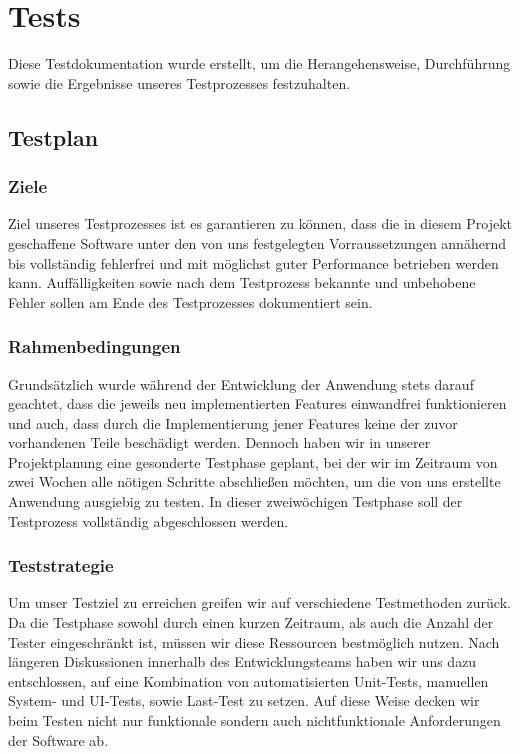 \chapter{Tests}
Diese Testdokumentation wurde erstellt, um die Herangehensweise, Durchführung sowie die Ergebnisse unseres Testprozesses festzuhalten.

\section{Testplan}

\subsection{Ziele}
Ziel unseres Testprozesses ist es garantieren zu können, dass die in diesem Projekt geschaffene Software unter den von uns festgelegten Vorraussetzungen annähernd bis vollständig fehlerfrei und mit möglichst guter Performance betrieben werden kann. Auffälligkeiten sowie nach dem Testprozess bekannte und unbehobene Fehler sollen am Ende des Testprozesses dokumentiert sein.

\subsection{Rahmenbedingungen}
Grundsätzlich wurde während der Entwicklung der Anwendung stets darauf geachtet, dass die jeweils neu implementierten Features einwandfrei funktionieren und auch, dass durch die Implementierung jener Features keine der zuvor vorhandenen Teile beschädigt werden. Dennoch haben wir in unserer Projektplanung eine gesonderte Testphase geplant, bei der wir im Zeitraum von zwei Wochen alle nötigen Schritte abschließen möchten, um die von uns erstellte Anwendung ausgiebig zu testen. In dieser zweiwöchigen Testphase soll der Testprozess vollständig abgeschlossen werden.

\subsection{Teststrategie}
Um unser Testziel zu erreichen greifen wir auf verschiedene Testmethoden zurück. Da die Testphase sowohl durch einen kurzen Zeitraum, als auch die Anzahl der Tester eingeschränkt ist, müssen wir diese Ressourcen bestmöglich nutzen. Nach längeren Diskussionen innerhalb des Entwicklungsteams haben wir uns dazu entschlossen, auf eine Kombination von automatisierten Unit-Tests, manuellen System- und UI-Tests, sowie Last-Test zu setzen. Auf diese Weise decken wir beim Testen nicht nur funktionale sondern auch nichtfunktionale Anforderungen der Software ab.

